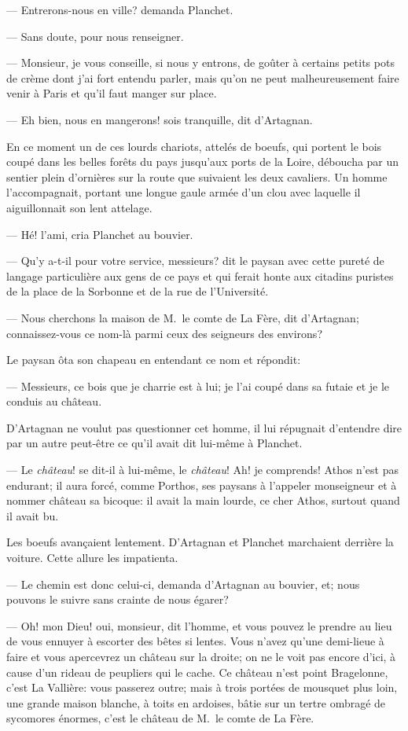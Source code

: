— Entrerons-nous en ville? demanda Planchet.

— Sans doute, pour nous renseigner.

— Monsieur, je vous conseille, si nous y entrons, de goûter à certains petits pots de crème dont j'ai fort entendu parler, mais qu'on ne peut malheureusement faire venir à Paris et qu'il faut manger sur place.

— Eh bien, nous en mangerons! sois tranquille, dit d'Artagnan.

En ce moment un de ces lourds chariots, attelés de boeufs, qui portent le bois coupé dans les belles forêts du pays jusqu'aux ports de la Loire, déboucha par un sentier plein d'ornières sur la route que suivaient les deux cavaliers. Un homme l'accompagnait, portant une longue gaule armée d'un clou avec laquelle il aiguillonnait son lent attelage.

— Hé! l'ami, cria Planchet au bouvier.

— Qu'y a-t-il pour votre service, messieurs? dit le paysan avec cette pureté de langage particulière aux gens de ce pays et qui ferait honte aux citadins puristes de la place de la Sorbonne et de la rue de l'Université.

— Nous cherchons la maison de M.~le comte de La Fère, dit d'Artagnan; connaissez-vous ce nom-là parmi ceux des seigneurs des environs?

Le paysan ôta son chapeau en entendant ce nom et répondit:

— Messieurs, ce bois que je charrie est à lui; je l'ai coupé dans sa futaie et je le conduis au château.

D'Artagnan ne voulut pas questionner cet homme, il lui répugnait d'entendre dire par un autre peut-être ce qu'il avait dit lui-même à Planchet.

— Le \textit{château}! se dit-il à lui-même, le \textit{château}! Ah! je comprends! Athos n'est pas endurant; il aura forcé, comme Porthos, ses paysans à l'appeler monseigneur et à nommer château sa bicoque: il avait la main lourde, ce cher Athos, surtout quand il avait bu.

Les boeufs avançaient lentement. D'Artagnan et Planchet marchaient derrière la voiture. Cette allure les impatienta.

— Le chemin est donc celui-ci, demanda d'Artagnan au bouvier, et; nous pouvons le suivre sans crainte de nous égarer?

— Oh! mon Dieu! oui, monsieur, dit l'homme, et vous pouvez le prendre au lieu de vous ennuyer à escorter des bêtes si lentes. Vous n'avez qu'une demi-lieue à faire et vous apercevrez un château sur la droite; on ne le voit pas encore d'ici, à cause d'un rideau de peupliers qui le cache. Ce château n'est point Bragelonne, c'est La Vallière: vous passerez outre; mais à trois portées de mousquet plus loin, une grande maison blanche, à toits en ardoises, bâtie sur un tertre ombragé de sycomores énormes, c'est le château de M.~le comte de La Fère.

